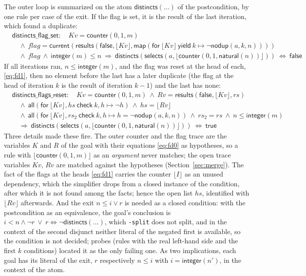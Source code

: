 \documentclass[11pt,a4paper]{article}
\newcommand{\bl}[1]{\lfloor #1\rfloor}                       %
\newcommand{\mapc}[2]{\mathsf{map}(\mathsf{for}\ #1\ \mathsf{yield}\ #2)}
\newcommand{\al}[2]{\mathsf{all}(\mathsf{for}\ #1\ \mathsf{check}\ #2)}
\newcommand{\cnt}{\mathsf{counter}}
\newcommand{\cur}{\mathsf{current}}
\newcommand{\intf}{\mathsf{integer}}
\newcommand{\natf}{\mathsf{natural}}
\newcommand{\lemma}[1]{\textsf{#1}}
\begin{document}
The outer loop is summarized on the atom $\mathsf{distincts}(\ldots)$ of the postcondition, by one rule per
case of the exit. If the flag is set, it is the result of the last iteration, which found a duplicate:
\begin{align*}
  &\lemma{distincts\_flag\_set}:\quad Kv = \cnt(0, 1, m)\\
  &\quad\wedge\ flag = \cur(\mathsf{results}(\mathsf{false}, \bl{Kv}, \mapc{\bl{Kv}}{k \mapsto \neg\mathsf{nodup}(a, k, n)}))\\
  &\quad\wedge\ flag\ \wedge\ \intf(m) \le n\ \Longrightarrow\ \mathsf{distincts}(\mathsf{selects}(a, \bl{\cnt(0, 1, \natf(n))}))\ \Longleftrightarrow\ \mathsf{false}
\end{align*}
If all iterations ran, $n \le \intf(m)$, and the flag was reset at the head of each, \eqref{eq:fd1}, then no
element before the last has a later duplicate (the flag at the head of iteration $k$ is the result of
iteration $k - 1$) and the last has none:
\begin{align*}
  &\lemma{distincts\_flags\_reset}:\quad Kv = \cnt(0, 1, m)\ \wedge\ Rv = \mathsf{results}(\mathsf{false}, \bl{Kv}, rs)\\
  &\quad\wedge\ \al{\bl{Kv}, hs}{k, h \mapsto \neg h}\ \wedge\ hs = \bl{Rv}\\
  &\quad\wedge\ \al{\bl{Kv}, rs_2}{k, h \mapsto h = \neg\mathsf{nodup}(a, k, n)}\ \wedge\ rs_2 = rs\ \wedge\ n \le \intf(m)\\
  &\quad\Longrightarrow\ \mathsf{distincts}(\mathsf{selects}(a, \bl{\cnt(0, 1, \natf(n))}))\ \Longleftrightarrow\ \mathsf{true}
\end{align*}
Three details made these fire. The outer counter and the flag trace are the variables $K$ and $R$ of the
goal with their equations \eqref{eq:fd0} as hypotheses, so a rule with $\bl{\cnt(0, 1, m)}$ as an
\emph{argument} never matches; the open trace variables $Kv$, $Rv$ are matched against the hypotheses
(Section~\ref{sec:merge}). The fact of the flags at the heads \eqref{eq:fd1} carries the counter $\bl{I}$ as
an unused dependency, which the simplifier drops from a closed instance of the condition, after which it
is not found among the facts; hence the open list $hs$, identified with $\bl{Rv}$ afterwards. And the exit
$n \le i \vee r$ is needed as a closed condition: with the postcondition as an equivalence, the goal's
conclusion is $i < n \wedge \neg r\ \vee\ r \Leftrightarrow \neg\mathsf{distincts}(\ldots)$, which
\texttt{-split} does not split, and in the context of the second disjunct neither literal of the negated
first is available, so the condition is not decided; probes (rules with the real left-hand side and the
first $k$ conditions) located it as the only failing one. As two implications, each goal has its literal
of the exit, $r$ respectively $n \le i$ with $i = \intf(n')$, in the context of the atom.
\end{document}
